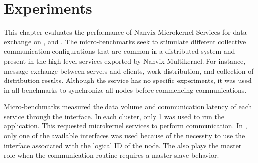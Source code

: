 \chapter{Experiments}
\label{ch.experiments}

	This chapter evaluates the performance of Nanvix Microkernel Services for
	data exchange on \mppa, \ie \mailbox and \portal. The micro-benchmarks seek to
	stimulate different collective communication configurations that are common in a
	distributed system and present in the high-level services exported by Nanvix
	Multikernel. For instance, message exchange between servers and clients, work
	distribution, and collection of distribution results. Although the \sync service
	has no specific experiments, it was used in all benchmarks to synchronize all nodes
	before commencing communications.

	Micro-benchmarks measured the data volume and communication latency of each
	service through the \ioctl interface. In each cluster, only 1 \pe was used
	to run the application. This \pe requested microkernel services to perform
	communication. In \iocluster, only one of the available interfaces was used
	because of the necessity to use the interface associated with the logical ID
	of the node. The \iocluster also plays the master role when the communication
	routine requires a master-slave behavior.


